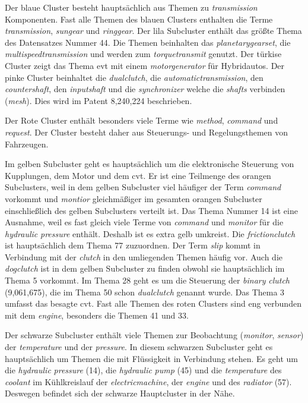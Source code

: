  
Der blaue Cluster besteht hauptsächlich aus Themen zu \emph{transmission} Komponenten. Fast alle Themen des blauen Clusters enthalten die Terme \emph{transmission}, \emph{sungear} und \emph{ringgear}. Der lila Subcluster enthält das größte Thema des Datensatzes Nummer 44. Die Themen beinhalten das \emph{planetarygearset}, die \emph{multispeedtransmission} und werden zum \emph{torquetransmit} genutzt. Der türkise Cluster zeigt das Thema \gls{evt} mit einem \emph{motorgenerator} für Hybridautos. Der pinke Cluster beinhaltet die \emph{dualclutch}, die  \emph{automatictransmission}, den \emph{countershaft}, den \emph{inputshaft} und die \emph{synchronizer} welche die \emph{shafts} verbinden (\emph{mesh}). Dies wird im Patent 8,240,224 beschrieben.
 
Der Rote Cluster enthält besonders viele Terme wie \emph{method}, \emph{command} und \emph{request}. Der Cluster besteht daher aus Steuerungs- und Regelungsthemen von Fahrzeugen.
 
Im gelben Subcluster geht es hauptsächlich um die elektronische Steuerung von Kupplungen, dem Motor und dem \gls{cvt}. Er ist eine Teilmenge des orangen Subclusters, weil in dem gelben Subcluster viel häufiger der Term \emph{command} vorkommt und \emph{montior} gleichmäßiger im gesamten orangen Subcluster einschließlich des gelben Subclusters verteilt ist. Das Thema Nummer 14 ist eine Ausnahme, weil es fast gleich viele Terme von \emph{command} und \emph{monitor} für die \emph{hydraulic} \emph{pressure} enthält. Deshalb ist es extra gelb umkreist. Die \emph{frictionclutch} ist hauptsächlich dem Thema 77 zuzuordnen. Der Term \emph{slip} kommt in Verbindung mit der \emph{clutch} in den umliegenden Themen häufig vor. Auch die \emph{dogclutch} ist in dem gelben Subcluster zu finden obwohl sie hauptsächlich im Thema 5 vorkommt. Im Thema 28 geht es um die Steuerung der \emph{binary} \emph{clutch} (9,061,675), die im Thema 50 schon \emph{dualclutch} genannt wurde. Das Thema 3 umfasst das besagte \gls{cvt}. Fast alle Themen des roten Clusters sind eng verbunden mit dem \emph{engine}, besonders die Themen 41 und 33.
 
Der schwarze Subcluster enthält viele Themen zur Beobachtung (\emph{monitor}, \emph{sensor}) der \emph{temperature} und der \emph{pressure}. In diesem schwarzen Subcluster geht es hauptsächlich um Themen die mit Flüssigkeit in Verbindung stehen. Es geht um die \emph{hydraulic} \emph{pressure} (14), die \emph{hydraulic} \emph{pump} (45) und die \emph{temperature} des \emph{coolant} im Kühlkreislauf der \emph{electricmachine}, der \emph{engine} und des \emph{radiator} (57). Deswegen befindet sich der schwarze Hauptcluster in der Nähe.
 
